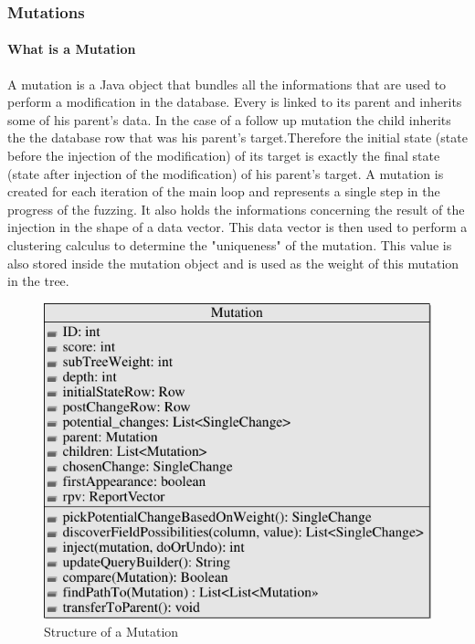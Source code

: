 \documentclass{article}
\begin{document}
\begin{empfile}
  				
			\subsubsection{Mutations}
				\paragraph{What is a Mutation}
A mutation is a Java object that bundles all the informations that are used to perform a modification in the database. Every is linked to its parent and inherits some of his parent's data. In the case of a follow up mutation the child inherits the the database row that was his parent's target.Therefore the initial state (state before the injection of the modification) of its target is exactly the final state (state after injection of the modification) of his parent's target. A mutation is created for each iteration of the main loop and represents a single step in the progress of the fuzzing.
It also holds the informations concerning the result of the injection in the shape of a data vector. This data vector is then used to perform a clustering calculus to determine the "uniqueness" of the mutation. This value is also stored inside the mutation object and is used as the weight of this mutation in the tree.

\clearpage

\begin{figure} [h!]
\centering
\includegraphics[width=\textwidth]{MutationClassDiagram-1.pdf}
\caption{Structure of a Mutation}
\end{figure}


\end{empfile}
\end{document}
